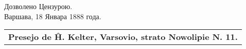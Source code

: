 \vspace*{12em}

\begin{table}[h]
\begin{center}
{\large Дозволено Цензурою. \\
\vspace{1ex}
Варшава, 18 Январа 1888 года.}
\end{center}

\end{table}

\setlength{\parskip}{0pt}

\vspace*{\fill}

\begin{flushright}
\begin{tabular}{r}
\hline
\bf\footnotesize Presejo de Ĥ. Kelter, Varsovio, strato Nowolipie N. 11.
\end{tabular}
\end{flushright}

\vspace*{\fill}

